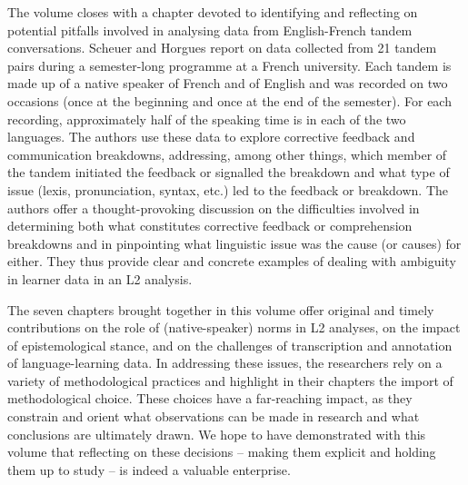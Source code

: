 \documentclass[output=paper]{../langscibook}
\begin{document}
The volume closes with a chapter devoted to identifying and reflecting on potential pitfalls involved in analysing data from English-French tandem conversations. Scheuer and Horgues report on data collected from 21 tandem pairs during a semester-long programme at a French university. Each tandem is made up of a native speaker of French and of English and was recorded on two occasions (once at the beginning and once at the end of the semester). For each recording, approximately half of the speaking time is in each of the two languages. The authors use these data to explore corrective feedback and communication breakdowns, addressing, among other things, which member of the tandem initiated the feedback or signalled the breakdown and what type of issue (lexis, pronunciation, syntax, etc.) led to the feedback or breakdown. The authors offer a thought-provoking discussion on the difficulties involved in determining both what constitutes corrective feedback or comprehension breakdowns and in pinpointing what linguistic issue was the cause (or causes) for either. They thus provide clear and concrete examples of dealing with ambiguity in learner data in an L2 analysis.

The seven chapters brought together in this volume offer original and timely contributions on the role of (native-speaker) norms in L2 analyses, on the impact of epistemological stance, and on the challenges of transcription and annotation of language-learning data. In addressing these issues, the researchers rely on a variety of methodological practices and highlight in their chapters the import of methodological choice. These choices have a far-reaching impact, as they constrain and orient what observations can be made in research and what conclusions are ultimately drawn. We hope to have demonstrated with this volume that reflecting on these decisions – making them explicit and holding them up to study – is indeed a valuable enterprise. 

\sloppy\printbibliography[heading=subbibliography,notkeyword=this]
\end{document}
